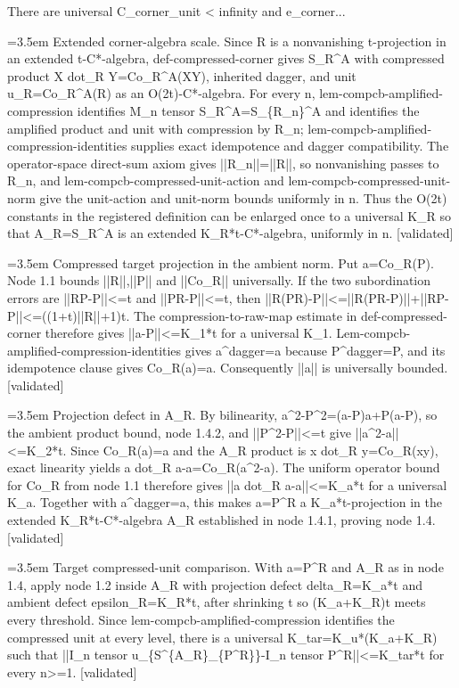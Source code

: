 \documentclass{article}
\newcommand{\step}[1]{\par\noindent\hangindent=3.5em\hangafter=1%
  \makebox[3.5em][l]{\textbf{#1.}}}
\newcommand{\steptag}[1]{\hfill{\small\textsf{[#1]}}}
\begin{document}
\begin{proofbox}{There are universal C\_corner\_unit < infinity and e\_corner...}
\step{1.4.1} Extended corner-algebra scale. Since R is a nonvanishing t-projection in an extended t-C*-algebra, def-compressed-corner gives S\_R\textasciicircum{}A with compressed product X dot\_R Y=Co\_R\textasciicircum{}A(XY), inherited dagger, and unit u\_R=Co\_R\textasciicircum{}A(R) as an O(2t)-C*-algebra. For every n, lem-compcb-amplified-compression identifies M\_n tensor S\_R\textasciicircum{}A=S\_\{R\_n\}\textasciicircum{}A and identifies the amplified product and unit with compression by R\_n; lem-compcb-amplified-compression-identities supplies exact idempotence and dagger compatibility. The operator-space direct-sum axiom gives ||R\_n||=||R||, so nonvanishing passes to R\_n, and lem-compcb-compressed-unit-action and lem-compcb-compressed-unit-norm give the unit-action and unit-norm bounds uniformly in n. Thus the O(2t) constants in the registered definition can be enlarged once to a universal K\_R so that A\_R=S\_R\textasciicircum{}A is an extended K\_R*t-C*-algebra, uniformly in n. \steptag{validated} \\[4pt]
\step{1.4.2} Compressed target projection in the ambient norm. Put a=Co\_R(P). Node 1.1 bounds ||R||,||P|| and ||Co\_R|| universally. If the two subordination errors are ||RP-P||<=t and ||PR-P||<=t, then ||R(PR)-P||<=||R(PR-P)||+||RP-P||<=((1+t)||R||+1)t. The compression-to-raw-map estimate in def-compressed-corner therefore gives ||a-P||<=K\_1*t for a universal K\_1. Lem-compcb-amplified-compression-identities gives a\textasciicircum{}dagger=a because P\textasciicircum{}dagger=P, and its idempotence clause gives Co\_R(a)=a. Consequently ||a|| is universally bounded. \steptag{validated} \\[4pt]
\step{1.4.3} Projection defect in A\_R. By bilinearity, a\textasciicircum{}2-P\textasciicircum{}2=(a-P)a+P(a-P), so the ambient product bound, node 1.4.2, and ||P\textasciicircum{}2-P||<=t give ||a\textasciicircum{}2-a||<=K\_2*t. Since Co\_R(a)=a and the A\_R product is x dot\_R y=Co\_R(xy), exact linearity yields a dot\_R a-a=Co\_R(a\textasciicircum{}2-a). The uniform operator bound for Co\_R from node 1.1 therefore gives ||a dot\_R a-a||<=K\_a*t for a universal K\_a. Together with a\textasciicircum{}dagger=a, this makes a=P\textasciicircum{}R a K\_a*t-projection in the extended K\_R*t-C*-algebra A\_R established in node 1.4.1, proving node 1.4. \steptag{validated} \\[4pt]
\step{1.5} Target compressed-unit comparison. With a=P\textasciicircum{}R and A\_R as in node 1.4, apply node 1.2 inside A\_R with projection defect delta\_R=K\_a*t and ambient defect epsilon\_R=K\_R*t, after shrinking t so (K\_a+K\_R)t meets every threshold. Since lem-compcb-amplified-compression identifies the compressed unit at every level, there is a universal K\_tar=K\_u*(K\_a+K\_R) such that ||I\_n tensor u\_\{S\textasciicircum{}\{A\_R\}\_\{P\textasciicircum{}R\}\}-I\_n tensor P\textasciicircum{}R||<=K\_tar*t for every n>=1. \steptag{validated} \\[6pt]

\end{proofbox}
\end{document}
